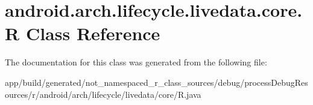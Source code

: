 \hypertarget{classandroid_1_1arch_1_1lifecycle_1_1livedata_1_1core_1_1_r}{}\section{android.\+arch.\+lifecycle.\+livedata.\+core.\+R Class Reference}
\label{classandroid_1_1arch_1_1lifecycle_1_1livedata_1_1core_1_1_r}


The documentation for this class was generated from the following file\+:\begin{DoxyCompactItemize}
\item 
app/build/generated/not\+\_\+namespaced\+\_\+r\+\_\+class\+\_\+sources/debug/process\+Debug\+Resources/r/android/arch/lifecycle/livedata/core/R.\+java\end{DoxyCompactItemize}
